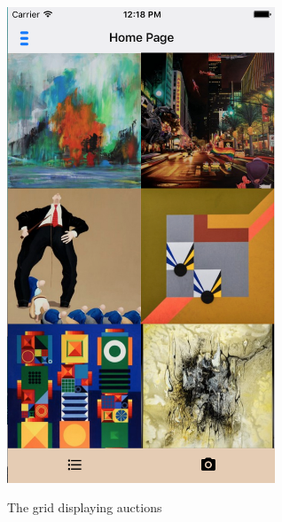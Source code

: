 \begin{figure}[H]
    \centering
\caption{The grid displaying auctions}
\includegraphics[width=8cm]{Appendix/Grid.png}
\label{AuctionsGrid}
\end{figure}